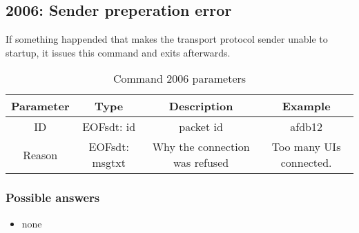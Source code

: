 \subsection{2006: Sender preperation error}
If something happended that makes the transport protocol sender
unable to startup, it issues this command and exits afterwards.
\begin{longtable}{|c|c|c|c|}
\caption{Command 2006 parameters}\\
\hline
\textbf{Parameter} & \textbf{Type} & \textbf{Description} & \textbf{Example}\\
\hline
ID & EOFsdt: id & packet id & afdb12\\
\hline
Reason & EOFsdt: msgtxt & Why the connection was refused & Too many UIs connected.\\
\hline
\end{longtable}
\subsubsection{Possible answers}
\begin{itemize}
\item none
\end{itemize}


